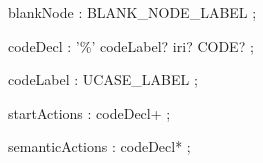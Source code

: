 \documentclass{article}
\def\bnf#1{{\scriptsize {{#1}} }}
\begin{document}
\begin{framed}
\noindent
\bnf{blankNode       : BLANK\_NODE\_LABEL ;}
\end{framed}


\begin{framed}
\noindent
\bnf{codeDecl        : '\%' codeLabel? iri? CODE? ;}
\end{framed}


\begin{framed}
\noindent
\bnf{codeLabel       : UCASE\_LABEL ;}
\end{framed}


\begin{framed}
\noindent
\bnf{startActions    : codeDecl+ ;}
\end{framed}


\begin{framed}
\noindent
\bnf{semanticActions    : codeDecl* ;}
\end{framed}
\end{document}
